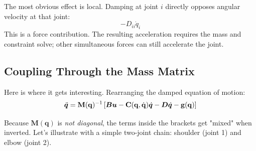 The most obvious effect is local. Damping at joint $i$ directly opposes angular velocity at that joint:
\[
-D_{ii} \dot{q}_i
\]
This is a force contribution. The resulting acceleration requires the mass and constraint solve; other simultaneous forces can still accelerate the joint.

\subsection{Coupling Through the Mass Matrix}
\label{subsec:mass_coupling}


Here is where it gets interesting. Rearranging the damped equation of motion:
\[
\ddot{\bm{q}} = \mathbf{M}(\mathbf{q})^{-1} \left[ \bm{B}\bm{u} - \mathbf{C}(\mathbf{q},\dot{\mathbf{q}})\dot{\bm{q}} - \bm{D}\dot{\bm{q}} - \mathbf{g}(\mathbf{q}) \right]
\]

Because $\mathbf{M}(\mathbf{q})$ is \emph{not diagonal}, the terms inside the brackets get "mixed" when inverted. Let's illustrate with a simple two-joint chain: shoulder (joint 1) and elbow (joint 2).

